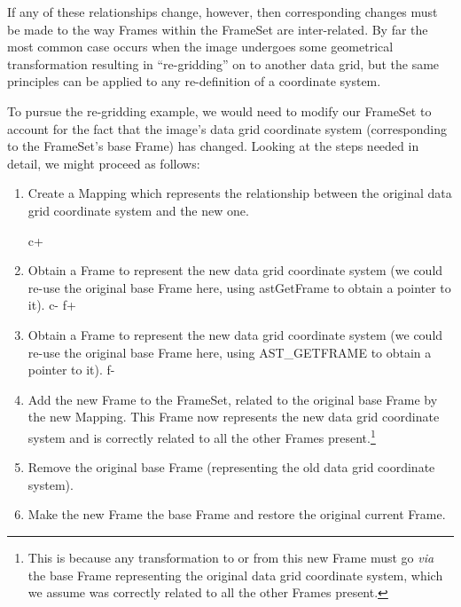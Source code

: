 \documentclass[twoside,11pt]{starlink}
\begin{document}
{If any of these relationships change, however, then corresponding
changes must be made to the way Frames within the FrameSet are
inter-related. By far the most common case occurs when the image
undergoes some geometrical transformation resulting in ``re-gridding''
on to another data grid, but the same principles can be applied to any
re-definition of a coordinate system.

To pursue the re-gridding example, we would need to modify our
FrameSet to account for the fact that the image's data grid coordinate
system (corresponding to the FrameSet's base Frame) has
changed. Looking at the steps needed in detail, we might proceed as
follows:

\begin{enumerate}
\item Create a Mapping which represents the relationship between the
original data grid coordinate system and the new one.

c+
\item Obtain a Frame to represent the new data grid coordinate system
(we could re-use the original base Frame here, using astGetFrame to
obtain a pointer to it).
c-
f+
\item Obtain a Frame to represent the new data grid coordinate system
(we could re-use the original base Frame here, using AST\_GETFRAME to
obtain a pointer to it).
f-

\item Add the new Frame to the FrameSet, related to the original base
Frame by the new Mapping. This Frame now represents the new data grid
coordinate system and is correctly related to all the other Frames
present.\footnote{This is because any transformation to or from this
new Frame must go \emph{via} the base Frame representing the original
data grid coordinate system, which we assume was correctly related to
all the other Frames present.}

\item Remove the original base Frame (representing the old data grid
coordinate system).

\item Make the new Frame the base Frame and restore the original
current Frame.
\end{enumerate}

}
\end{document}
